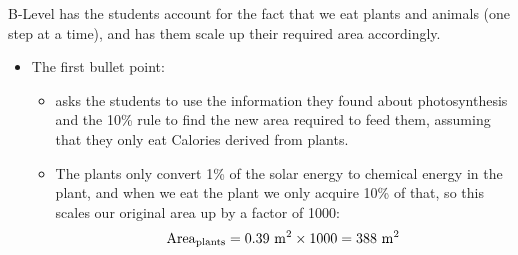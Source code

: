 \documentclass[fleqn,letterpaper]{article}
\begin{document}
B-Level has the students account for the fact that we eat plants and animals (one step at a time), and has them scale up their required area accordingly.


\begin{itemize}
\item{The first bullet point:
  \begin{itemize}
  \item{asks the students to use the information they found about photosynthesis and the 10\% rule to find the new area required to feed them, assuming that they only eat Calories derived from plants.}
  \item{The plants only convert 1\% of the solar energy to chemical energy in the plant, and when we eat the plant we only acquire 10\% of that, so this scales our original area up by a factor of 1000:
  \begin{equation}
   {\rm Area}_{\rm plants} = 0.39~{\rm m^2} \times 1000 = 388~{\rm m^2}
  \end{equation}
}
  \end{itemize}}
  

\end{itemize}
\end{document}
